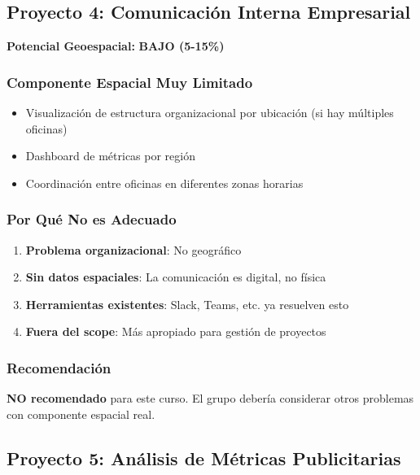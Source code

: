 \documentclass[11pt,a4paper]{article}
\newcommand{\bajo}[1]{\textcolor{rojo}{\textbf{#1}}}
\begin{document}
\newpage

\subsection{Proyecto 4: Comunicación Interna Empresarial}

\begin{tcolorbox}[colframe=rojo,colback=red!10]
\textbf{Potencial Geoespacial:} \bajo{BAJO (5-15\%)}
\end{tcolorbox}

\subsubsection{Componente Espacial Muy Limitado}

\begin{itemize}
    \item Visualización de estructura organizacional por ubicación (si hay múltiples oficinas)
    \item Dashboard de métricas por región
    \item Coordinación entre oficinas en diferentes zonas horarias
\end{itemize}

\subsubsection{Por Qué No es Adecuado}

\begin{enumerate}
    \item \textbf{Problema organizacional}: No geográfico
    \item \textbf{Sin datos espaciales}: La comunicación es digital, no física
    \item \textbf{Herramientas existentes}: Slack, Teams, etc. ya resuelven esto
    \item \textbf{Fuera del scope}: Más apropiado para gestión de proyectos
\end{enumerate}

\subsubsection{Recomendación}
\textbf{NO recomendado} para este curso. El grupo debería considerar otros problemas con componente espacial real.

\newpage

\subsection{Proyecto 5: Análisis de Métricas Publicitarias}
\end{document}
